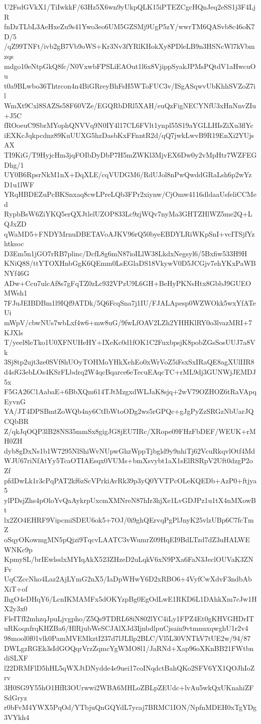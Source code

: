 U2FsdGVkX1/TiIwkkF/63Hz5X6wn9yUkpQLK15iPTEZCgcHQnJeq2eSS1j3F4LjR
fnDzTLbL3AeHxeZu9s41Ywo3eo6UM5GZSMj9UgP5zY/wwrTM6QASvb8c46oK7D/5
/qZ99TNFt/ivb2gB7Vb9oWS+Kr3Nv3fYRlKHokXy8PDleLB9n3HSNcWl7kVbmzqs
mdgo10eNtpGkQ8fc/N0VxwbFPSLiEAOut1l6x8VjippSyakJPMsPQtdV1aHwcuOu
t0a9BLwbo36Thtrcon4n4BiGRreyBhFsH5WToFUC3v/ISgASqwvUbKhhSVZoZ7il
WmXt9Cxl8SAZSs58F60VZe/EGQRbDRl5XAH/euQzFigNECYNfU3xHnNnvZIu+J5C
fROoeuC9SbrMYophQNVVq9N0IY4l17CL6FVlt1ynpl55S19aYGLLHIsZiXu3flYc
iEXKcJqkpcdnz89KuUUXG5hzDasbKxFFnntR2d/qQ7jwkLwvB9R19EnXi2YUjsAX
TI9KiG/T9HyjcHm3jqFOIbDyDbP7H5mZWKl3MjvEX6Dw0y2vMpHtr7WZFEGDhg/1
UY0B6RpsrNkM1nX+DqXLE/cqVUDGM6/RdUJol8nPwQwddGRaLsh6p2wYzD1u1lWF
YRqHBDEZuPcBKSnxaq8cwLPreLQb3FPr2xiynw/CjOmw4116dldaaUsfeliCCMed
RypbBsW6ZiYKQ5erQXJtlelUZOP833Lc9zjWQv7nyMa3GHTZHlWZ5me2Q+LQJxZD
qWaMD5+FNDYMrnuDBETAVoAJKV96rQ50byeEBDYLRiWKpSnI+vcITSjfYzhtksoc
D3Em5n1jGO7rRB7plinc/DcfL8g6mN87ioILlW38LkdxNegsyl6/5Bxfiw533H9H
KNiQ8S/ttYTOXHnbGgK6QEmm0LsEGlaDS18VkywV0D5JCGjv7ehYKxPaWBNYf46G
ADw+Ccu7ulcAf8s7gFqTZ0zLc932VPzU9L6GH+BeHyPKNsHtx8GbbJ9GUEOMWsh1
7FJuJEIBDBm1l9IQf9ATDk/5Q6FcqSna7j1IU/FJALApesp0WZWOkk5wxYfATeUi
mWpV/cbwNUs7wbLxf4w6+mw8uG/9fwLfOAV2LZh2YHHKlRY0o3lvazMRI+7KJXls
T/yeel8leTko1U0XFNUHeHY+IXeKc0d1fOK1C2FuxbpsjK8pobZGsSosUUJ7a8Vk
3Sj8tp2ujt3ze0SVf8hUOyTOHMoYHkXehEo0xWrVoZ5iFsxSxIRaQE8agXUlIIR8
d4sfG3ebLOs4KSrFLbdrq2W4qcBqarce6eTecuEAqcTC+rML9dj3GUNWjJEMDJ5x
F5GA26C1AabaE+6BbXQm614TJtMzgxdWLJaK8sjq+2wV79OZHOZ6tRaVApqEyvnG
YA/JT4DPSBmtZoWQb4ny6CtIbWtoODg2ws5rGPQc+gJgPyZzSRGzNbUarJQCQbBR
Z/qkJqOQP3lB28NS35mmSx8gigJG8jEU7IRc/XRope09FHzFbDEF/WEUK+rMH0ZH
dyb8gDxNs1b1W7295NlShiWvNUpwGhzWppTjbgld9y9nhiTj62VcuRkqvlOtf4Md
WJU67riNfAtYy5TcaOTIAEsqx0VUMs+bmXsvybt1aX1sElRSRpV2Uft0dzgP2oZf
pfdDwLk1r3cPqPAT2kf6zScVPrkiAvRk39p3yQ0YVTPcOLeKQEDb+AzP0+ftjya5
ylPDsjZhs4pOloYvQaAykrpUxcmXMNreN87hIr3hjXe1LvGDJPz1u1tX4nMXowBt
lx2ZO4EHRF9VipcmiSDEU6ok5+7OJ/0i9ghQErvqPgPlJnyK25vlzUBp6C7fcTmZ
oSqyOKowmgMN5pQjzi9TqcvLAATC3vWumrZ09HqEI9BdLTzd7dZ3uHALWEWNKc9p
KpmySL/brIEwlsslxMYIqAkX523ZHzeD2uLqkV6xN9PXa6FaN3JeclOUVaK3ZNFv
UqCZccNho4Laz2AjLYmG2nX5/IaDpWHwY6D2xRBO6+4VyfCwXdvF3ndbAbXiT+of
IhgO4eDHqY6/LcnIKMAMFx5dOKYzpBg0EgOdLwE1RKD6L1DAhkXm7cJw1HX2y3x0
FleITfI2mhzqJpuLjvgpho/Z5Qs9TDRL68iN802lYC4iLy1FPZ4Et0gKHVGHDrIT
uRKoqnfrqKHZBa6/HlRjubWeSCJAlXJd3IjnbdlpuCjsain9vtmnuxqwghU1r2v4
98mool0f01vlk0PamMVEMkztI237d7lJLIlp2BLC/Vl5L30VNTkV7tUE2w/94/87
DWLgzRGEk3sIdGOQqrVrzZqmcYgWMO8l1/JaRNd+Xap96oXKnBB21FWtbndiSLXF
l22DRMFlD5hHL5qWXJtDNydde4e9uei17coINqdctBahQKo2SFV6YX1QOJhIoZrv
3H0SG9Y55hO1HfR3OUrwwi2WBA6MHLoZBLpZEUdc+lvAu5wkQxUKnahiZFSdGryz
r0bFvM4YWX5PqOd/YTbjuQnGQYdL7ycaj7BRMC1ION/NpfnMDEH0xTgYDg3VYkh4
